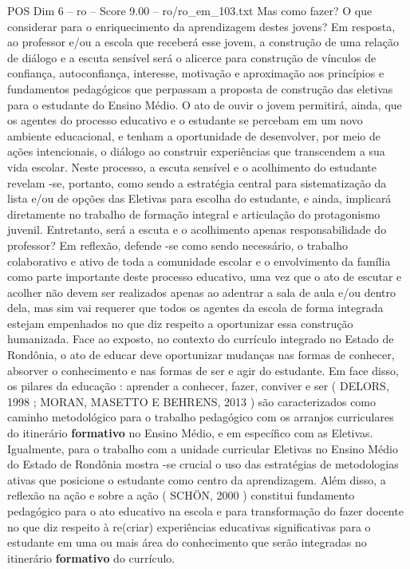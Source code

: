 \begin{textsample}{POS Dim 6 – ro – Score 9.00 – ro/ro\_em\_103.txt}
Mas como fazer?
O que considerar para o enriquecimento da aprendizagem destes jovens?
Em resposta, ao professor e/ou a escola que receberá esse jovem, a construção de uma relação de diálogo e a escuta sensível será o alicerce para construção de vínculos de confiança, autoconfiança, interesse, motivação e aproximação aos princípios e fundamentos pedagógicos que perpassam a proposta de construção das eletivas para o estudante do Ensino Médio.
O ato de ouvir o jovem permitirá, ainda, que os agentes do processo educativo e o estudante se percebam em um novo ambiente educacional, e tenham a oportunidade de desenvolver, por meio de ações intencionais, o diálogo ao construir experiências que transcendem a sua vida escolar.
Neste processo, a escuta sensível e o acolhimento do estudante revelam -se, portanto, como sendo a estratégia central para sistematização da lista e/ou de opções das Eletivas para escolha do estudante, e ainda, implicará diretamente no trabalho de formação integral e articulação do protagonismo juvenil.
Entretanto, será a escuta e o acolhimento apenas responsabilidade do professor?
Em reflexão, defende -se como sendo necessário, o trabalho colaborativo e ativo de toda a comunidade escolar e o envolvimento da família como parte importante deste processo educativo, uma vez que o ato de escutar e acolher não devem ser realizados apenas ao adentrar a sala de aula e/ou dentro dela, mas sim vai requerer que todos os agentes da escola de forma integrada estejam empenhados no que diz respeito a oportunizar essa construção humanizada.
Face ao exposto, no contexto do currículo integrado no Estado de Rondônia, o ato de educar deve oportunizar mudanças nas formas de conhecer, absorver o conhecimento e nas formas de ser e agir do estudante.
Em face disso, os pilares da educação : aprender a conhecer, fazer, conviver e ser ( DELORS, 1998 ; MORAN, MASETTO E BEHRENS, 2013 ) são caracterizados como caminho metodológico para o trabalho pedagógico com os arranjos curriculares do itinerário \textbf{formativo} no Ensino Médio, e em específico com as Eletivas.
Igualmente, para o trabalho com a unidade curricular Eletivas no Ensino Médio do Estado de Rondônia mostra -se crucial o uso das estratégias de metodologias ativas que posicione o estudante como centro da aprendizagem.
Além disso, a reflexão na ação e sobre a ação ( SCHÖN, 2000 ) constitui fundamento pedagógico para o ato educativo na escola e para transformação do fazer docente no que diz respeito à re(criar) experiências educativas significativas para o estudante em uma ou mais área do conhecimento que serão integradas no itinerário \textbf{formativo} do currículo.

\end{textsample}

